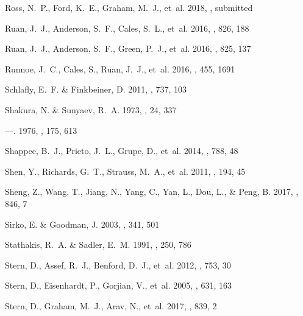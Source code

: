 \documentclass[iop]{emulateapj}
\begin{document}
\begin{thebibliography}{84}
Ross, N.~P., Ford, K.~E., Graham, M.~J., {et~al.} 2018, \mnras, submitted

Ruan, J.~J., Anderson, S.~F., Cales, S.~L., {et~al.} 2016{}, \apj,
  826, 188

Ruan, J.~J., Anderson, S.~F., Green, P.~J., {et~al.} 2016{}, \apj,
  825, 137

Runnoe, J.~C., Cales, S., Ruan, J.~J., {et~al.} 2016, \mnras, 455, 1691

Schlafly, E.~F. \& Finkbeiner, D. 2011, \apj, 737, 103

Shakura, N. \& Sunyaev, R.~A. 1973, \aap, 24, 337

---. 1976, \mnras, 175, 613

Shappee, B.~J., Prieto, J.~L., Grupe, D., {et~al.} 2014, \apj, 788, 48

Shen, Y., Richards, G.~T., Strauss, M.~A., {et~al.} 2011, \apjs, 194, 45

Sheng, Z., Wang, T., Jiang, N., Yang, C., Yan, L., Dou, L., \& Peng, B. 2017,
  \apj, 846, 7

Sirko, E. \& Goodman, J. 2003, \mnras, 341, 501

Stathakis, R.~A. \& Sadler, E.~M. 1991, \mnras, 250, 786

Stern, D., Assef, R.~J., Benford, D.~J., {et~al.} 2012, \apj, 753, 30

Stern, D., Eisenhardt, P., Gorjian, V., {et~al.} 2005, \apj, 631, 163

Stern, D., Graham, M.~J., Arav, N., {et~al.} 2017, \apj, 839, 2


\end{thebibliography}
\end{document}

